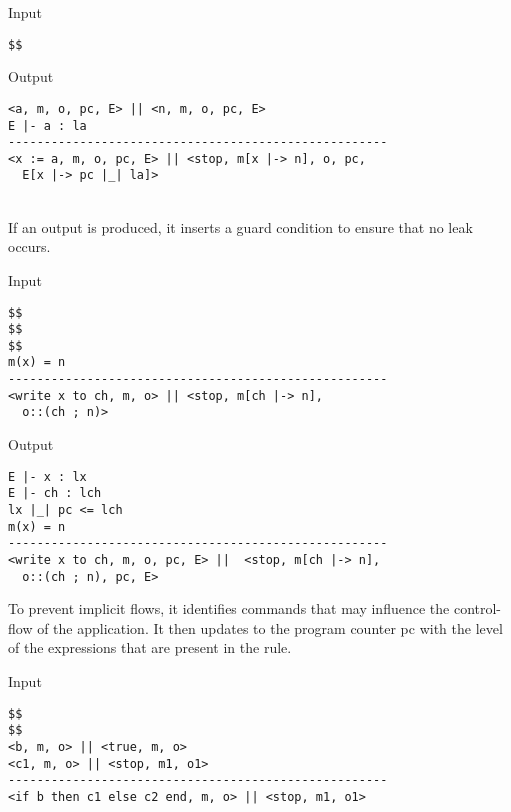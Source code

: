 \documentclass[final]{beamer}
\newlength{\twocolwid}
\begin{document}
\begin{frame}[fragile]
\begin{columns}[t]
\begin{column}{\twocolwid}
\begin{minipage}[t]{0.48\linewidth}
\begin{alertblock}{Input}
\begin{lstlisting}
$$
\end{lstlisting}        
\end{alertblock}
\end{minipage}
\hfill%
\begin{minipage}[t]{0.48\linewidth}
\begin{alertblock}{Output}
\begin{lstlisting}
<a, m, o, pc, E> || <n, m, o, pc, E>
E |- a : la
-----------------------------------------------------
<x := a, m, o, pc, E> || <stop, m[x |-> n], o, pc, 
  E[x |-> pc |_| la]>
\end{lstlisting}
\end{alertblock}
\end{minipage}\\
\color{black}
If an output is produced, it inserts a guard condition to ensure that no leak occurs.
\noindent
\begin{minipage}[t]{0.48\linewidth}
\begin{alertblock}{Input}
\begin{lstlisting}
$$
$$
$$
m(x) = n
-----------------------------------------------------
<write x to ch, m, o> || <stop, m[ch |-> n], 
  o::(ch ; n)>
\end{lstlisting}        
\end{alertblock}
\end{minipage}
\hfill%
\begin{minipage}[t]{0.48\linewidth}
\begin{alertblock}{Output}
\begin{lstlisting}
E |- x : lx
E |- ch : lch
lx |_| pc <= lch
m(x) = n
-----------------------------------------------------
<write x to ch, m, o, pc, E> ||  <stop, m[ch |-> n], 
  o::(ch ; n), pc, E>
\end{lstlisting}
\end{alertblock}
\end{minipage}

\color{black}
To prevent implicit flows, it identifies commands that may influence the control-flow of the application. It then updates to the program counter pc with the level of the expressions that are present in the rule.\\
\noindent
\begin{minipage}[t]{0.48\linewidth}
\begin{alertblock}{Input}
\begin{lstlisting}
$$
$$
<b, m, o> || <true, m, o>
<c1, m, o> || <stop, m1, o1>
-----------------------------------------------------
<if b then c1 else c2 end, m, o> || <stop, m1, o1>





\end{lstlisting}
\end{alertblock}
\end{minipage}
\end{column}
\end{columns}
\end{frame}
\end{document}
